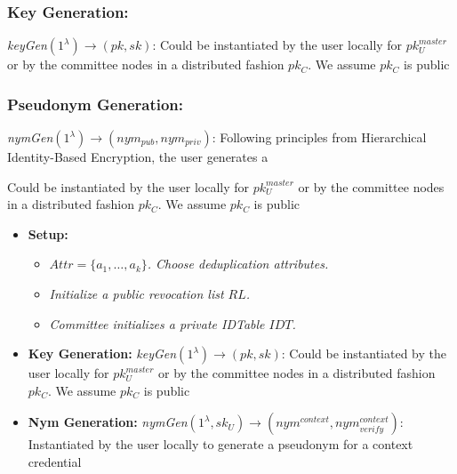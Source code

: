 \subsubsection{Key Generation:} \textit{keyGen$(1^\lambda) \rightarrow (pk, sk)$}:  Could be instantiated by the user locally for $pk_U^{master}$ or by the committee nodes in a distributed fashion $pk_C$. We assume $pk_C$ is public

\subsubsection{Pseudonym Generation:} \textit{nymGen$(1^\lambda) \rightarrow (nym_{pub}, nym_{priv} )$}: Following principles from Hierarchical Identity-Based Encryption, the user generates a 

Could be instantiated by the user locally for $pk_U^{master}$ or by the committee nodes in a distributed fashion $pk_C$. We assume $pk_C$ is public









\begin{itemize}
\item \textbf{Setup:}
       \begin{itemize}
            \item \textit{$Attr = \{a_1, \ldots, a_k\}$. Choose deduplication attributes.}
            \item \textit{Initialize a public revocation list $RL$.}
            \item \textit{Committee initializes a private IDTable $IDT$.}
        \end{itemize}
\end{itemize}

\begin{itemize}
\item \textbf{Key Generation:} \textit{keyGen$(1^\lambda) \rightarrow (pk, sk)$}:  Could be instantiated by the user locally for $pk_U^{master}$ or by the committee nodes in a distributed fashion $pk_C$. We assume $pk_C$ is public
\end{itemize}

\begin{itemize}
\item \textbf{Nym Generation:} \textit{nymGen$(1^\lambda, sk_U) \rightarrow (nym^{context}, nym^{context}_{verify})$}: Instantiated by the user locally to generate a pseudonym for a context credential
\end{itemize}


